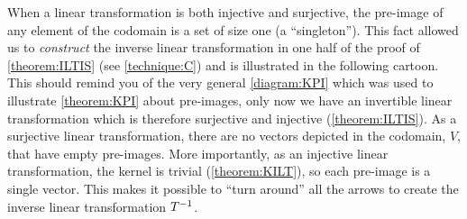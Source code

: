 \documentclass{ximera}
\begin{document}
When a linear transformation is both injective and surjective, the pre-image of any element of the codomain is a set of size one (a ``singleton'').  This fact allowed us to \textit{construct} the inverse linear transformation in one half of the proof of \ref{theorem:ILTIS} (see \ref{technique:C}) and is illustrated in the following cartoon.  This should remind you of the very general \ref{diagram:KPI} which was used to illustrate \ref{theorem:KPI} about pre-images, only now we have an invertible linear transformation which is therefore surjective and injective (\ref{theorem:ILTIS}).  As a surjective linear transformation, there are no vectors depicted in the codomain, $V$, that have empty pre-images.  More importantly, as an injective linear transformation, the kernel is trivial (\ref{theorem:KILT}), so each pre-image is a single vector.  This makes it possible to ``turn around'' all the arrows to create the inverse linear transformation $T^{-1}$.
\end{document}

